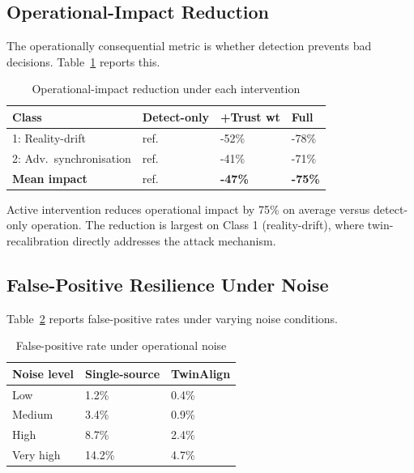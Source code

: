 \documentclass[sigconf,nonacm]{acmart}
\begin{document}
\subsection{Operational-Impact Reduction}

The operationally consequential metric is whether detection
prevents bad decisions. Table~\ref{tab:opimpact} reports this.

\begin{table}[h]
\caption{Operational-impact reduction under each intervention}
\label{tab:opimpact}
\small
\begin{tabularx}{\columnwidth}{@{}p{2.6cm}X X X@{}}
\toprule
\textbf{Class} & \textbf{Detect-only} & \textbf{+Trust wt} & \textbf{Full} \\
\midrule
1: Reality-drift            & ref. & -52\% & -78\% \\
2: Adv.\ synchronisation    & ref. & -41\% & -71\% \\
\midrule
\textbf{Mean impact}        & ref. & \textbf{-47\%} & \textbf{-75\%} \\
\bottomrule
\end{tabularx}
\end{table}

Active intervention reduces operational impact by 75\% on average
versus detect-only operation. The reduction is largest on Class 1
(reality-drift), where twin-recalibration directly addresses the
attack mechanism.

\subsection{False-Positive Resilience Under Noise}

Table~\ref{tab:fp} reports false-positive rates under varying
noise conditions.

\begin{table}[h]
\caption{False-positive rate under operational noise}
\label{tab:fp}
\small
\begin{tabularx}{\columnwidth}{@{}p{2.6cm}X X@{}}
\toprule
\textbf{Noise level} & \textbf{Single-source} & \textbf{TwinAlign} \\
\midrule
Low                  & 1.2\% & 0.4\% \\
Medium               & 3.4\% & 0.9\% \\
High                 & 8.7\% & 2.4\% \\
Very high            & 14.2\% & 4.7\% \\
\bottomrule
\end{tabularx}
\end{table}
\end{document}
